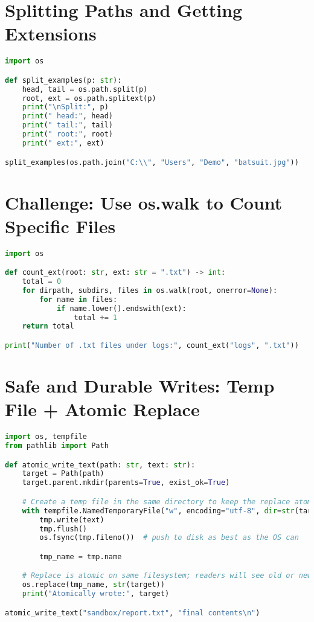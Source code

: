 \section{Splitting Paths and Getting Extensions}

\begin{lstlisting}[language=Python, caption={Split with os.path.split and get extension with splitext.}]
import os

def split_examples(p: str):
    head, tail = os.path.split(p)
    root, ext = os.path.splitext(p)
    print("\nSplit:", p)
    print(" head:", head)
    print(" tail:", tail)
    print(" root:", root)
    print(" ext:", ext)

split_examples(os.path.join("C:\\", "Users", "Demo", "batsuit.jpg"))
\end{lstlisting}

\section{Challenge: Use os.walk to Count Specific Files}

\begin{lstlisting}[language=Python, caption={Count .txt files and handle permissions gracefully.}]
import os

def count_ext(root: str, ext: str = ".txt") -> int:
    total = 0
    for dirpath, subdirs, files in os.walk(root, onerror=None):
        for name in files:
            if name.lower().endswith(ext):
                total += 1
    return total

print("Number of .txt files under logs:", count_ext("logs", ".txt"))
\end{lstlisting}

\section{Safe and Durable Writes: Temp File + Atomic Replace}

\begin{lstlisting}[language=Python, caption={Avoid partial writes by writing to a temp file and replacing.}]
import os, tempfile
from pathlib import Path

def atomic_write_text(path: str, text: str):
    target = Path(path)
    target.parent.mkdir(parents=True, exist_ok=True)

    # Create a temp file in the same directory to keep the replace atomic
    with tempfile.NamedTemporaryFile("w", encoding="utf-8", dir=str(target.parent), delete=False) as tmp:
        tmp.write(text)
        tmp.flush()
        os.fsync(tmp.fileno())  # push to disk as best as the OS can

        tmp_name = tmp.name

    # Replace is atomic on same filesystem; readers will see old or new, not partial
    os.replace(tmp_name, str(target))
    print("Atomically wrote:", target)

atomic_write_text("sandbox/report.txt", "final contents\n")
\end{lstlisting}

